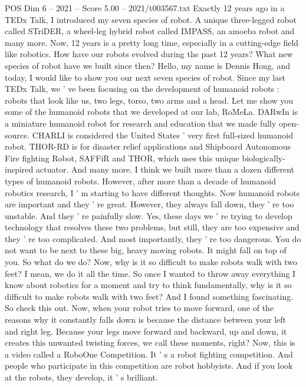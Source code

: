 \begin{textsample}{POS Dim 6 – 2021 – Score 5.00 – 2021/t003567.txt}  \label{ex:f6_pos_077}
Exactly 12 years ago in a TEDx Talk, I introduced my seven species of robot.
A unique three-legged robot called STriDER, a wheel-leg hybrid robot called IMPASS, an amoeba robot and many more.
Now, 12 years is a pretty long time, especially in a cutting-edge field like robotics.
How have our robots evolved during the past 12 years?
What new species of robot have we built since then?
Hello, my name is Dennis Hong, and today, I would like to show you our next seven species of robot.
Since my last TEDx Talk, we ' ve been focusing on the development of humanoid robots : robots that look like us, two legs, torso, two arms and a head.
Let me show you some of the humanoid robots that we developed at our lab, RoMeLa.
DARwIn is a miniature humanoid robot for research and education that we made fully open-source.
CHARLI is considered the United States ' very first full-sized humanoid robot.
THOR-RD is for disaster relief applications and Shipboard Autonomous Fire fighting Robot, SAFFiR and THOR, which uses this unique biologically-inspired actuator.
And many more.
I think we built more than a dozen different types of humanoid robots.
However, after more than a decade of humanoid robotics research, I ' m starting to have different thoughts.
Now humanoid robots are important and they ' re great.
However, they always fall down, they ' re too unstable.
And they ' re painfully slow.
Yes, these days we ' re trying to develop technology that resolves these two problems, but still, they are too expensive and they ' re too complicated.
And most importantly, they ' re too dangerous.
You do not want to be next to these big, heavy moving robots.
It might fall on top of you.
So what do we do?
Now, why is it so difficult to make robots walk with two feet?
I mean, we do it all the time.
So once I wanted to throw away everything I know about robotics for a moment and try to think fundamentally, why is it so difficult to make robots walk with two feet?
And I found something fascinating.
So check this out.
Now, when your robot tries to move forward, one of the reasons why it constantly falls down is because the distance between your left and right leg.
Because your legs move forward and backward, up and down, it creates this unwanted twisting forces, we call these moments, right?
Now, this is a video called a RoboOne Competition.
It ' s a robot fighting competition.
And people who participate in this competition are robot hobbyists.
And if you look at the robots, they develop, it ' s brilliant.

\end{textsample}
